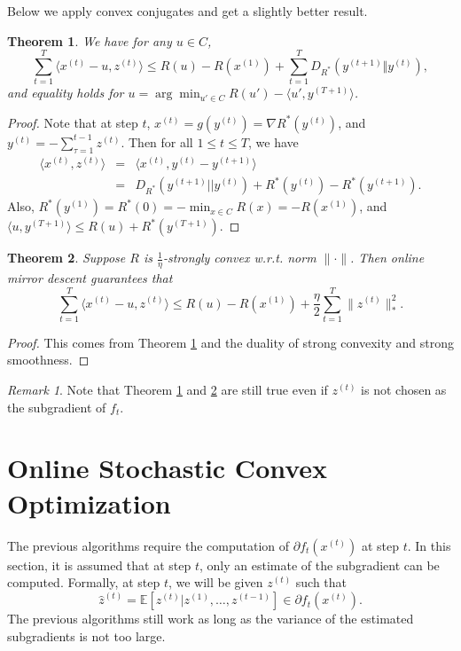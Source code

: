 \documentclass[openany]{book}
\newtheorem{theorem}{Theorem}[chapter]
\theoremstyle{definition}
\theoremstyle{remark}
\newtheorem*{remark}{Remark}
\begin{document}
Below we apply convex conjugates and get a slightly better result.
\begin{theorem}\label{onlineDABound1}
    We have for any $u\in C$,
    \begin{equation}
        \sum_{t=1}^{T}\langle x^{(t)}-u,z^{(t)}\rangle\le R(u)-R(x^{(1)})+\sum_{t=1}^{T}D_{R^*}(y^{(t+1)}\Vert y^{(t)}),
    \end{equation}
    and equality holds for $u=\arg\min_{u'\in C}R(u')-\langle u',y^{(T+1)}\rangle$.
\end{theorem}
\begin{proof}
    Note that at step $t$, $x^{(t)}=g(y^{(t)})=\nabla R^*(y^{(t)})$, and $y^{(t)}=-\sum_{\tau=1}^{t-1}z^{(t)}$. Then for all $1\le t\le T$, we have
    \begin{equation}
        \begin{array}{rcl}
            \langle x^{(t)},z^{(t)}\rangle & = & \langle x^{(t)},y^{(t)}-y^{(t+1)}\rangle \\
             & = & D_{R^*}(y^{(t+1)}||y^{(t)})+R^*(y^{(t)})-R^*(y^{(t+1)}).
        \end{array}
    \end{equation}
    Also, $R^*(y^{(1)})=R^*(0)=-\min_{x\in C}R(x)=-R(x^{(1)})$, and $\langle u,y^{(T+1)}\rangle\le R(u)+R^*(y^{(T+1)})$.
\end{proof}
\begin{theorem}\label{onlineDABound2}
    Suppose $R$ is $\frac{1}{\eta}$-strongly convex w.r.t. norm $\|\cdot\|$. Then online mirror descent guarantees that
    \begin{equation}
        \sum_{t=1}^{T}\langle x^{(t)}-u,z^{(t)}\rangle\le R(u)-R(x^{(1)})+\frac{\eta}{2}\sum_{t=1}^{T}\|z^{(t)}\|_*^2.
    \end{equation}
\end{theorem}
\begin{proof}
    This comes from Theorem \ref{onlineDABound1} and the duality of strong convexity and strong smoothness.
\end{proof}
\begin{remark}
    Note that Theorem \ref{onlineDABound1} and \ref{onlineDABound2} are still true even if $z^{(t)}$ is not chosen as the subgradient of $f_t$.
\end{remark}

\section{Online Stochastic Convex Optimization}
The previous algorithms require the computation of $\partial f_t(x^{(t)})$ at step $t$. In this section, it is assumed that at step $t$, only an estimate of the subgradient can be computed. Formally, at step $t$, we will be given $z^{(t)}$ such that
\begin{equation}
    \hat{z}^{(t)}=\mathbb{E}[z^{(t)}|z^{(1)},\ldots,z^{(t-1)}]\in\partial f_t(x^{(t)}).
\end{equation}
The previous algorithms still work as long as the variance of the estimated subgradients is not too large.
\end{document}
